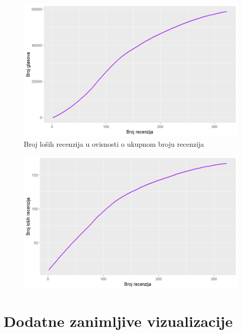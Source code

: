 	\begin{figure}[H]
		\centering
		\includegraphics[width=15cm]{../figures/lucija_slozeni/recenzijeglasovi.png}
		\caption{Broj loših recenzija u ovisnosti o ukupnom broju recenzija}
		\label{napredni3}
	\end{figure}
	
	\begin{figure}[H]
		\centering
		\includegraphics[width=15cm]{../figures/lucija_slozeni/recenzijelose.png}
		\caption{}
		\label{napredni4}
	\end{figure}
	
	
	\section{Dodatne zanimljive vizualizacije}